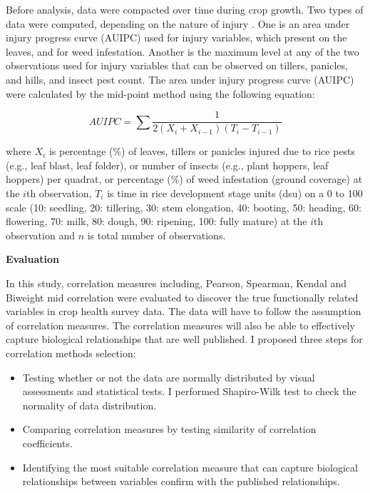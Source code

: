 Before analysis, data were compacted over time during crop growth. Two types of data were computed, depending on the nature of injury \citet{Savary_2009_Survey}. One is an area under injury progress curve (AUIPC) used for injury variables, which present on the leaves, and for weed infestation. Another is the maximum level at any of the two observations used for injury variables that can be observed on tillers, panicles, and hills, and insect pest count. The area under injury progress curve (AUIPC) \citep{Campbell_1990_Introduction} were calculated by the mid-point method using the following equation: 

\begin{equation}
AUIPC = \sum{\frac{1}{2(X_{i} + X_{i-1})(T_{i} - T_{i-1})}}
\end{equation}

where $X_i$ is percentage (\%) of leaves, tillers or panicles injured due to rice pests (e.g., leaf blast, leaf folder), or number of insects (e.g., plant hoppers, leaf hoppers) per quadrat, or percentage (\%) of weed infestation (ground coverage) at the $i$th observation, $T_i$ is time in rice development stage units (dsu) on a 0 to 100 scale (10: seedling, 20: tillering, 30: stem elongation, 40: booting, 50: heading, 60: flowering, 70: milk, 80: dough, 90: ripening, 100: fully mature) at the $i$th observation and $n$ is total number of observations.


\textbf{Evaluation}

In this study, correlation measures including, Pearson, Spearman, Kendal and Biweight mid correlation were evaluated to discover the true functionally related variables in crop health survey data.  The data will have to follow the assumption of correlation measures. The correlation measures will also be able to effectively capture biological relationships that are well published. I proposed three steps for correlation methods selection: 

\begin{itemize}
\item Testing whether or not the data are normally distributed by visual assessments and statistical tests. I performed Shapiro-Wilk test to check the normality of data distribution.
\item Comparing correlation measures by testing similarity of correlation coefficients. 
\item Identifying the most suitable correlation measure that can capture biological relationships between variables confirm with the published relationships.
\end{itemize}

